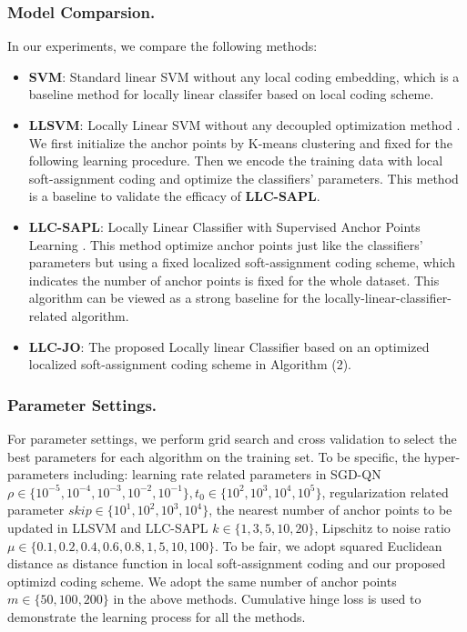 \documentclass{llncs}
\begin{document}
	\subsubsection{Model Comparsion.}
	In our experiments, we compare the following methods:
	\begin{itemize}
		\item \textbf{SVM}: Standard linear SVM without any local coding embedding, which is a baseline method for locally linear classifer based on local coding scheme.
		\item \textbf{LLSVM}: Locally Linear SVM without any decoupled optimization method \cite{2}. We first initialize the anchor points by K-means clustering and fixed for the following learning procedure. Then we encode the training data with local soft-assignment coding and optimize the classifiers' parameters. This method is a baseline to validate the efficacy of \textbf{LLC-SAPL}.
		\item \textbf{LLC-SAPL}: Locally Linear Classifier with Supervised Anchor Points Learning \cite{4}. This method optimize anchor points just like the classifiers' parameters but using a fixed localized soft-assignment coding scheme, which indicates the number of anchor points is fixed for the whole dataset. This algorithm can be viewed as a strong baseline for the locally-linear-classifier-related algorithm.
		\item \textbf{LLC-JO}: The proposed Locally linear Classifier based on an optimized localized soft-assignment coding scheme in Algorithm (2).
	\end{itemize}
	\subsubsection{Parameter Settings.}
	For parameter settings, we perform grid search and cross validation to select the best parameters for each algorithm on the training set. To be specific, the hyper-parameters including: learning rate related parameters in SGD-QN $\rho \in \{10^{-5},10^{-4}, 10^{-3}, 10^{-2},10^{-1}\}, t_0 \in \{10^2,10^3,10^4,10^5\}$, regularization related parameter $skip \in \{10^1,10^2,10^3,10^4\}$, the nearest number of anchor points to be updated in LLSVM and LLC-SAPL $k \in \{1,3,5,10,20\}$, Lipschitz to noise ratio $\mu \in \{0.1,0.2,0.4,0.6,0.8,1,5,10,100\}$. To be fair, we adopt squared Euclidean distance as distance function in local soft-assignment coding and our proposed optimizd coding scheme. We adopt the same number of anchor points $m \in \{50,100,200\}$ in the above methods. Cumulative hinge loss is used to demonstrate the learning process for all the methods.
\end{document}
